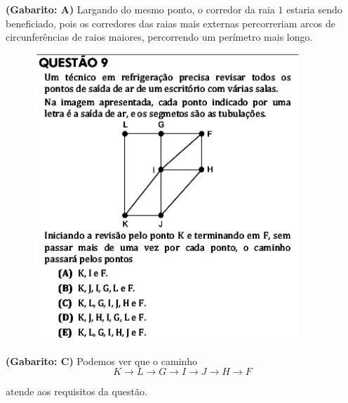 \documentclass[a4paper]{article}
\begin{document}
\par\textbf{(Gabarito: A)} Largando do mesmo ponto, o corredor da raia $1$ estaria sendo beneficiado, pois os corredores das raias mais externas percorreriam arcos de circunferências de raios maiores, percorrendo um perímetro mais longo.
\begin{figure}[H]
	\begin{center}
		\includegraphics[width=10cm]{L5Q9.png}
	\end{center}
\end{figure}
\par\textbf{(Gabarito: C)} Podemos ver que o caminho 
$$ K\to L\to G\to I\to J\to H\to F $$
\par\vspace{0.3cm} atende aos requisitos da questão.
\end{document}
